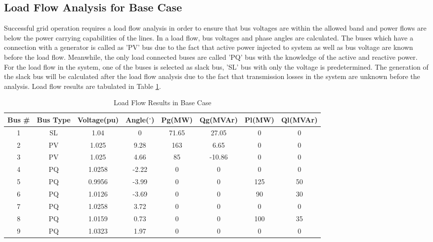 \subsection{Load Flow Analysis for Base Case}
Successful grid operation requires a load flow analysis in order to ensure that bus voltages are within the allowed band and power flows are below the power carrying capabilities of the lines. In a load flow, bus voltages and phase angles are calculated. The buses which have a connection with a generator is called as 'PV' bus due to the fact that active power injected to system as well as bus voltage are known before the load flow. Meanwhile, the only load connected buses are called 'PQ' bus with the knowledge of the active and reactive power. For the load flow in the system, one of the buses is selected as slack bus, 'SL' bus with only the voltage is predetermined. The generation of the slack bus will be calculated after the load flow analysis due to the fact that transmission losses in the system are unknown before the analysis. Load flow results are tabulated in Table \ref{loadflow_case1}.
\begin{table}[h!]
	\centering
	\resizebox{\textwidth}{!}
	{
	\begin{tabular}{cclccccc}
		\hline
		Bus \# & Bus Type & \multicolumn{1}{c}{Voltage(pu)} & Angle($^{\circ}$) & Pg(MW)& Qg(MVAr)& Pl(MW)  & Ql(MVAr) \\ \hline
		1      & SL       & \multicolumn{1}{c}{1.04}    & 0     & 71.65 & 27.05  & 0   & 0  \\
		2      & PV       & \multicolumn{1}{c}{1.025}   & 9.28  & 163   & 6.65   & 0   & 0  \\
		3      & PV       & \multicolumn{1}{c}{1.025}   & 4.66  & 85    & -10.86 & 0   & 0  \\
		4      & PQ       & \multicolumn{1}{c}{1.0258}                      & -2.22 & 0     & 0      & 0   & 0  \\
		5      & PQ       & \multicolumn{1}{c}{0.9956}                      & -3.99 & 0     & 0      & 125 & 50 \\
		6      & PQ       & \multicolumn{1}{c}{1.0126}                      & -3.69 & 0     & 0      & 90  & 30 \\
		7      & PQ       & \multicolumn{1}{c}{1.0258}                      & 3.72  & 0     & 0      & 0   & 0  \\
		8      & PQ       & \multicolumn{1}{c}{1.0159}                      & 0.73  & 0     & 0      & 100 & 35 \\
		9      & PQ       & \multicolumn{1}{c}{1.0323}                      & 1.97  & 0     & 0      & 0   & 0  \\ \hline
	\end{tabular}
}
	\caption{Load Flow Results in Base Case}
	\label{loadflow_case1}
\end{table}
